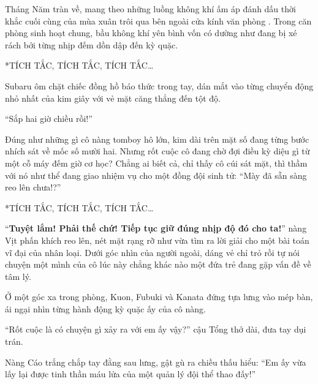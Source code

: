 \documentclass[../main.tex]{subfiles}
\begin{document}
\color{black}


Tháng Năm tràn về, mang theo những luồng không khí ấm áp đánh dấu thời khắc cuối cùng của mùa xuân trôi qua bên ngoài cửa kính văn phòng \hll. Trong căn phòng sinh hoạt chung, bầu không khí yên bình vốn có dường như đang bị xé rách bởi từng nhịp đếm dồn dập đến kỳ quặc.

*TÍCH TẮC, TÍCH TẮC, TÍCH TẮC\dots*

Subaru ôm chặt chiếc đồng hồ báo thức trong tay, dán mắt vào từng chuyển động nhỏ nhất của kim giây với vẻ mặt căng thẳng đến tột độ.


``Sắp hai giờ chiều rồi!''

Đúng như những gì cô nàng tomboy hô lớn, kim dài trên mặt số đang từng bước nhích sát về mốc số mười hai. Nhưng rốt cuộc cô đang chờ đợi điều kỳ diệu gì từ một cỗ máy đếm giờ cơ học? Chẳng ai biết cả, chỉ thấy cô cúi sát mặt, thì thầm với nó như thể đang giao nhiệm vụ cho một đồng đội sinh tử: ``Mày đã sẵn sàng reo lên chưa!?''

*TÍCH TẮC, TÍCH TẮC, TÍCH TẮC\dots*

``\textbf{Tuyệt lắm! Phải thế chứ! Tiếp tục giữ đúng nhịp độ đó cho ta!}'' nàng Vịt phấn khích reo lên, nét mặt rạng rỡ như vừa tìm ra lời giải cho một bài toán vĩ đại của nhân loại. Dưới góc nhìn của người ngoài, dáng vẻ chỉ trỏ rồi tự nói chuyện một mình của cô lúc này chẳng khác nào một đứa trẻ đang gặp vấn đề về tâm lý.

Ở một góc xa trong phòng, Kuon, Fubuki và Kanata đứng tựa lưng vào mép bàn, ái ngại nhìn từng hành động kỳ quặc ấy của cô nàng.


``Rốt cuộc là có chuyện gì xảy ra với em ấy vậy?'' cậu Tổng thở dài, đưa tay dụi trán.

Nàng Cáo trắng chắp tay đằng sau lưng, gật gù ra chiều thấu hiểu: ``Em ấy vừa lấy lại được tinh thần máu lửa của một quản lý đội thể thao đấy!''
\end{document}
